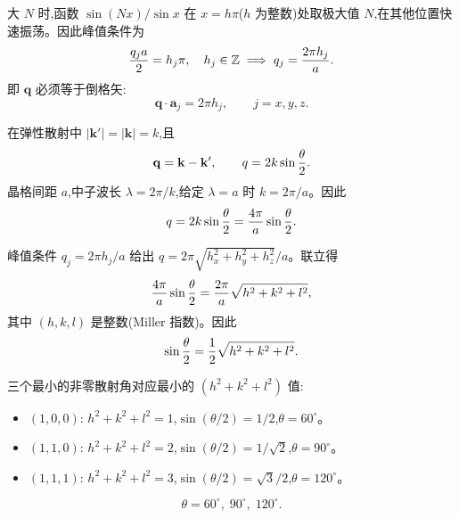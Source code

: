 \begin{solution}
大 $N$ 时,函数 $\sin(Nx)/\sin x$ 在 $x=h\pi$($h$ 为整数)处取极大值 $N$,在其他位置快速振荡。因此峰值条件为
\[
{q_j a\over2}=h_j\pi,\quad h_j\in\mathbb Z\;\Longrightarrow\;q_j={2\pi h_j\over a}.
\]
即 $\mathbf q$ 必须等于倒格矢:
\[
\boxed{\mathbf q\cdot\mathbf a_j=2\pi h_j,\qquad j=x,y,z.}
\]

在弹性散射中 $|\mathbf k'|=|\mathbf k|=k$,且
\[
\mathbf q=\mathbf k-\mathbf k',\qquad q=2k\sin{\theta\over2}.
\]
晶格间距 $a$,中子波长 $\lambda=2\pi/k$,给定 $\lambda=a$ 时 $k=2\pi/a$。因此
\[
q=2k\sin{\theta\over2}={4\pi\over a}\sin{\theta\over2}.
\]

峰值条件 $q_j=2\pi h_j/a$ 给出 $q=2\pi\sqrt{h_x^2+h_y^2+h_z^2}/a$。联立得
\[
{4\pi\over a}\sin{\theta\over2}={2\pi\over a}\sqrt{h^2+k^2+l^2},
\]
其中 $(h,k,l)$ 是整数(Miller 指数)。因此
\[
\sin{\theta\over2}={1\over2}\sqrt{h^2+k^2+l^2}.
\]

三个最小的非零散射角对应最小的 $(h^2+k^2+l^2)$ 值:
\begin{itemize}
\item $(1,0,0)$: $h^2+k^2+l^2=1$,$\sin(\theta/2)=1/2$,$\theta=60^\circ$。
\item $(1,1,0)$: $h^2+k^2+l^2=2$,$\sin(\theta/2)=1/\sqrt{2}$,$\theta=90^\circ$。
\item $(1,1,1)$: $h^2+k^2+l^2=3$,$\sin(\theta/2)=\sqrt{3}/2$,$\theta=120^\circ$。
\end{itemize}
\[
\boxed{\theta=60^\circ,\;90^\circ,\;120^\circ.}
\]
\end{solution}

